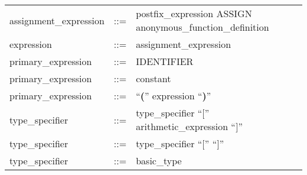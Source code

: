 \begin{longtable}{lrl}
assignment\_expression                     & ::= &
  \begin{minipage}[t]{\rulerhs}
    \raggedright
    postfix\_expression ASSIGN anonymous\_function\_definition
  \end{minipage}                                                             \\
expression                                 & ::= &
  \begin{minipage}[t]{\rulerhs}
    \raggedright
    assignment\_expression
  \end{minipage}                                                             \\
primary\_expression                        & ::= &
  \begin{minipage}[t]{\rulerhs}
    \raggedright
    IDENTIFIER
  \end{minipage}                                                             \\
primary\_expression                        & ::= &
  \begin{minipage}[t]{\rulerhs}
    \raggedright
    constant
  \end{minipage}                                                             \\
primary\_expression                        & ::= &
  \begin{minipage}[t]{\rulerhs}
    \raggedright
    ``{\bf (}'' expression ``{\bf )}''
  \end{minipage}                                                             \\
type\_specifier                            & ::= &
  \begin{minipage}[t]{\rulerhs}
    \raggedright
    type\_specifier ``{\bf $[$}'' arithmetic\_expression ``{\bf $]$}''
  \end{minipage}                                                             \\
type\_specifier                            & ::= &
  \begin{minipage}[t]{\rulerhs}
    \raggedright
    type\_specifier ``{\bf $[$}'' ``{\bf $]$}''
  \end{minipage}                                                             \\
type\_specifier                            & ::= &
  \begin{minipage}[t]{\rulerhs}
    \raggedright
    basic\_type
  \end{minipage}                                                             \\

\end{longtable}
